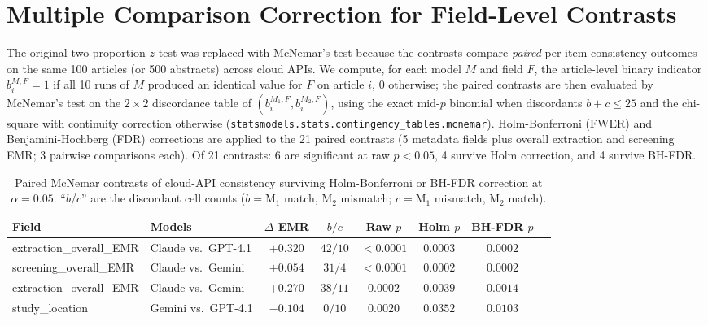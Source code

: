 \documentclass[11pt]{article}
\newenvironment{fittab}{\begin{lrbox}{\fittabbox}}{\end{lrbox}%
  \ifdim\wd\fittabbox>\linewidth\resizebox{\linewidth}{!}{\usebox{\fittabbox}}\else\usebox{\fittabbox}\fi}
\begin{document}
\section{Multiple Comparison Correction for Field-Level Contrasts}
\label{sec:mcc_supp}

The original two-proportion $z$-test was replaced with McNemar's test because the contrasts compare \emph{paired} per-item consistency outcomes on the same 100 articles (or 500 abstracts) across cloud APIs.
We compute, for each model $M$ and field $F$, the article-level binary indicator $b_i^{M,F}{=}1$ if all 10 runs of $M$ produced an identical value for $F$ on article $i$, $0$ otherwise; the paired contrasts are then evaluated by McNemar's test on the $2{\times}2$ discordance table of $(b_i^{M_1,F}, b_i^{M_2,F})$, using the exact mid-$p$ binomial when discordants $b{+}c{\leq}25$ and the chi-square with continuity correction otherwise (\texttt{statsmodels.stats.contingency\_tables.mcnemar}).
Holm-Bonferroni (FWER) and Benjamini-Hochberg (FDR) corrections are applied to the 21 paired contrasts (5 metadata fields plus overall extraction and screening EMR; 3 pairwise comparisons each). Of 21 contrasts: 6 are significant at raw $p{<}0.05$, 4 survive Holm correction, and 4 survive BH-FDR.

\begin{table}[htbp]
\centering
\caption{Paired McNemar contrasts of cloud-API consistency surviving Holm-Bonferroni or BH-FDR correction at $\alpha{=}0.05$. ``$b$/$c$'' are the discordant cell counts ($b{=}$M$_1$ match, M$_2$ mismatch; $c{=}$M$_1$ mismatch, M$_2$ match).}
\label{tab:mcc}
\begin{fittab}\begin{tabular}{llcccccc}
\toprule
\textbf{Field} & \textbf{Models} & \textbf{$\Delta$ EMR} & \textbf{$b/c$} & \textbf{Raw $p$} & \textbf{Holm $p$} & \textbf{BH-FDR $p$} \\
\midrule
extraction\_overall\_EMR  & Claude vs.\ GPT-4.1   & $+0.320$ & $42/10$ & $<\!0.0001$    & $\mathbf{0.0003}$    & $\mathbf{0.0002}$ \\
screening\_overall\_EMR   & Claude vs.\ Gemini    & $+0.054$ & $31/4$  & $<\!0.0001$    & $\mathbf{0.0002}$    & $\mathbf{0.0002}$ \\
extraction\_overall\_EMR  & Claude vs.\ Gemini    & $+0.270$ & $38/11$ & $0.0002$       & $\mathbf{0.0039}$    & $\mathbf{0.0014}$ \\
study\_location           & Gemini vs.\ GPT-4.1   & $-0.104$ & $0/10$  & $0.0020$       & $\mathbf{0.0352}$    & $\mathbf{0.0103}$ \\
\bottomrule
\end{tabular}\end{fittab}
\end{table}
\end{document}
